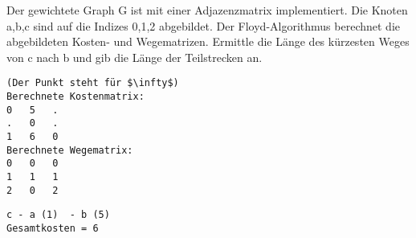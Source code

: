 ﻿\question[6]

Der gewichtete Graph G ist mit einer Adjazenzmatrix implementiert.
Die Knoten a,b,c sind auf die Indizes 0,1,2 abgebildet.
Der Floyd-Algorithmus berechnet die abgebildeten Kosten- und Wegematrizen.
Ermittle die Länge des kürzesten Weges von c nach b und gib die Länge der Teilstrecken an.
\begin{lstlisting}
(Der Punkt steht für $\infty$)
Berechnete Kostenmatrix:
0   5   .
.   0   .
1   6   0
Berechnete Wegematrix:
0   0   0
1   1   1
2   0   2
\end{lstlisting}

\begin{solutionbox}{4cm}

\begin{lstlisting}
c - a (1)  - b (5) 
Gesamtkosten = 6

\end{lstlisting}
\end{solutionbox}
